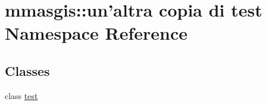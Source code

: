 \hypertarget{namespacemmasgis_1_1un'altra_01copia_01di_01test}{
\section{mmasgis::un'altra copia di test Namespace Reference}
\label{namespacemmasgis_1_1un'altra_01copia_01di_01test}
}
\subsection*{Classes}
\begin{DoxyCompactItemize}
\item 
class \hyperlink{classmmasgis_1_1un'altra_01copia_01di_01test_1_1test}{test}
\end{DoxyCompactItemize}
